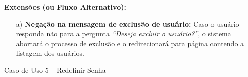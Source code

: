 \begin{mdframed}
\begin{flushleft}
		\textbf{Extensões (ou Fluxo Alternativo):}
		\begin{itemize}
			\item[a)] \textbf{Negação na mensagem de exclusão de usuário:} Caso o usuário responda não para a pergunta \textit{``Deseja excluir o usuário?''}, o sistema abortará o processo de exclusão e o redirecionará para página contendo a listagem dos usuários.
		\end{itemize}

		\end{flushleft}

	\end{mdframed}




\begin{quadro}[h!]\caption{Caso de Uso 5 -- Redefinir Senha}
\hfill
\end{quadro}
